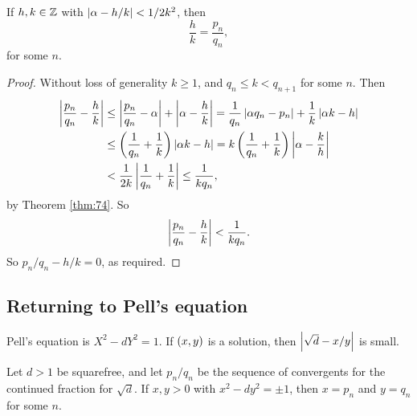 \begin{corollary}
\label{cor:75}
If $ h, k \in \mathbb{Z} $ with $ \left\lvert \alpha - h / k \right\rvert < 1 / 2k^2 $, then
$$ \dfrac{h}{k} = \dfrac{p_n}{q_n}, $$
for some $ n $.
\end{corollary}

\begin{proof}
Without loss of generality $ k \ge 1 $, and $ q_n \le k < q_{n + 1} $ for some $ n $. Then
\begin{align*}
\left\lvert \dfrac{p_n}{q_n} - \dfrac{h}{k} \right\rvert
& \le \left\lvert \dfrac{p_n}{q_n} - \alpha \right\rvert + \left\lvert \alpha - \dfrac{h}{k} \right\rvert
= \dfrac{1}{q_n}\left\lvert \alpha q_n - p_n \right\rvert + \dfrac{1}{k}\left\lvert \alpha k - h \right\rvert \\
& \le \left( \dfrac{1}{q_n} + \dfrac{1}{k} \right)\left\lvert \alpha k - h \right\rvert
= k\left( \dfrac{1}{q_n} + \dfrac{1}{k} \right)\left\lvert \alpha - \dfrac{k}{h} \right\rvert \\
& < \dfrac{1}{2k}\left\lvert \dfrac{1}{q_n} + \dfrac{1}{k} \right\rvert
\le \dfrac{1}{kq_n},
\end{align*}
by Theorem \ref{thm:74}. So
$$ \left\lvert \dfrac{p_n}{q_n} - \dfrac{h}{k} \right\rvert < \dfrac{1}{kq_n}. $$
So $ p_n / q_n - h / k = 0 $, as required.
\end{proof}


\subsection{Returning to Pell's equation}

Pell's equation is $ X^2 - dY^2 = 1 $. If $ \left( x, y \right) $ is a solution, then $ \left\lvert \sqrt{d} - x / y \right\rvert $ is small.

\begin{proposition}
Let $ d > 1 $ be squarefree, and let $ p_n / q_n $ be the sequence of convergents for the continued fraction for $ \sqrt{d} $. If $ x, y > 0 $ with $ x^2 - dy^2 = \pm 1 $, then $ x = p_n $ and $ y = q_n $ for some $ n $.
\end{proposition}

